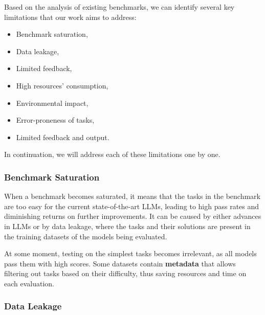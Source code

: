 Based on the analysis of existing benchmarks, we can identify several key limitations that our work aims to address:
\begin{itemize}
    \item Benchmark saturation,
    \item Data leakage,
    \item Limited feedback,
    \item High resources' consumption,
    \item Environmental impact,
    \item Error-proneness of tasks,
    \item Limited feedback and output.
\end{itemize}

In continuation, we will address each of these limitations one by one.

\subsubsection{Benchmark Saturation}

When a benchmark becomes saturated, it means that the tasks in the benchmark are too easy for the current state-of-the-art LLMs, leading to high pass rates and diminishing returns on further improvements.
It can be caused by either advances in LLMs or by data leakage, where the tasks and their solutions are present in the training datasets of the models being evaluated.

At some moment, testing on the simplest tasks becomes irrelevant, as all models pass them with high scores.
Some datasets contain \textbf{metadata} that allows filtering out tasks based on their difficulty, thus saving resources and time on each evaluation.

\subsubsection{Data Leakage}

